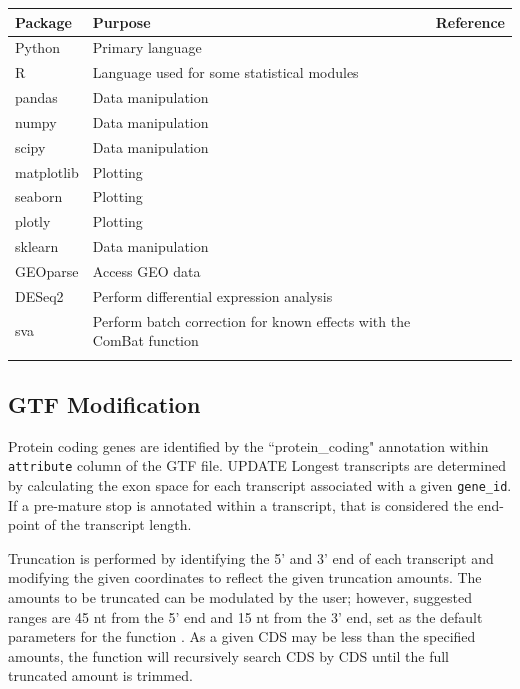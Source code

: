 \documentclass[11pt, a4paper, oneside]{article}
\begin{document}
\begin{tabular}{p{2.4cm}p{7.5cm}p{3cm}}
 \textbf{Package} & \textbf{Purpose} & \textbf{Reference} \\
 \hline
 Python & Primary language & \\
 \hline
 R & Language used for some statistical modules & \\
 \hline
 pandas & Data manipulation & \cite{pandas} \\
 \hline
 numpy & Data manipulation & \cite{numpy1, numpy2} \\
 \hline
 scipy & Data manipulation & \cite{scipy} \\
 \hline
 matplotlib & Plotting & \cite{matplotlib} \\
 \hline
 seaborn & Plotting & \cite{seaborn} \\
 \hline
 plotly & Plotting & \cite{plotly} \\
 \hline
 sklearn & Data manipulation & \cite{sklearn} \\
 \hline
 GEOparse & Access GEO data & \cite{geoparse} \\
 \hline
 DESeq2 & Perform differential expression analysis & \cite{deseq2} \\
 \hline
 sva & Perform batch correction for known effects with the ComBat function & \cite{sva} \\
 \label{Tab:software_plot}
 \end{tabular}
 \newline

\subsection{GTF Modification}
Protein coding genes are identified by the ``protein\_coding" annotation within \texttt{attribute} column of the GTF file.
UPDATE
Longest transcripts are determined by calculating the exon space for each transcript associated with a given \texttt{gene\_id}. If a pre-mature stop is annotated within a transcript, that is considered the end-point of the transcript length. \par
Truncation is performed by identifying the 5' and 3' end of each transcript and modifying the given coordinates to reflect the given truncation amounts. The amounts to be truncated can be modulated by the user; however, suggested ranges are 45 nt from the 5' end and 15 nt from the 3' end, set as the default parameters for the function \cite{ingolia_meth}. As a given CDS may be less than the specified amounts, the function will recursively search CDS by CDS until the full truncated amount is trimmed.
\end{document}
